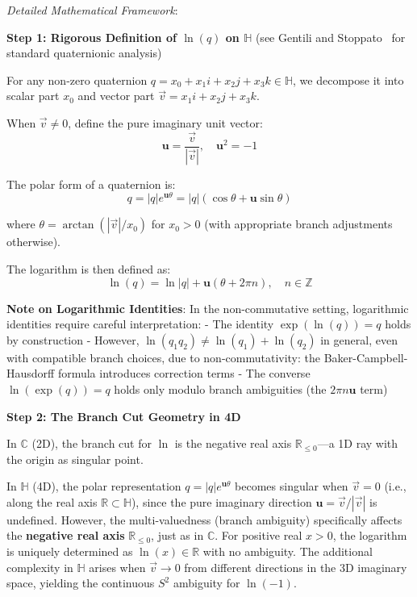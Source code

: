 \documentclass[11pt]{article}
\begin{document}
\emph{Detailed Mathematical Framework}:

\textbf{Step 1: Rigorous Definition of \(\ln(q)\) on $\mathbb{H}$} (see Gentili and Stoppato~\cite{GS13} for standard quaternionic analysis)

For any non-zero quaternion \(q = x_0 + x_1i + x_2j + x_3k \in \mathbb{H}\), we decompose it into scalar part \(x_0\) and vector part \(\vec{v} = x_1i + x_2j + x_3k\).

When \(\vec{v} \neq 0\), define the pure imaginary unit vector: \[\mathbf{u} = \frac{\vec{v}}{|\vec{v}|}, \quad \mathbf{u}^2 = -1\]

The polar form of a quaternion is: \[q = |q|e^{\mathbf{u}\theta} = |q|(\cos\theta + \mathbf{u}\sin\theta)\]

where \(\theta = \arctan(|\vec{v}|/x_0)\) for \(x_0 > 0\) (with appropriate branch adjustments otherwise).

The logarithm is then defined as: \[\ln(q) = \ln|q| + \mathbf{u}(\theta + 2\pi n), \quad n \in \mathbb{Z}\]

\textbf{Note on Logarithmic Identities}: In the non-commutative setting, logarithmic identities require careful interpretation: - The identity \(\exp(\ln(q)) = q\) holds by construction - However, \(\ln(q_1 q_2) \neq \ln(q_1) + \ln(q_2)\) in general, even with compatible branch choices, due to non-commutativity: the Baker-Campbell-Hausdorff formula introduces correction terms - The converse \(\ln(\exp(q)) = q\) holds only modulo branch ambiguities (the \(2\pi n \mathbf{u}\) term)

\textbf{Step 2: The Branch Cut Geometry in 4D}

In $\mathbb{C}$ (2D), the branch cut for \(\ln\) is the negative real axis \(\mathbb{R}_{\leq 0}\)---a 1D ray with the origin as singular point.

In $\mathbb{H}$ (4D), the polar representation $q = |q|e^{\mathbf{u}\theta}$ becomes singular when $\vec{v} = 0$ (i.e., along the real axis $\mathbb{R} \subset \mathbb{H}$), since the pure imaginary direction $\mathbf{u} = \vec{v}/|\vec{v}|$ is undefined. However, the multi-valuedness (branch ambiguity) specifically affects the \textbf{negative real axis} $\mathbb{R}_{\leq 0}$, just as in $\mathbb{C}$. For positive real $x > 0$, the logarithm is uniquely determined as $\ln(x) \in \mathbb{R}$ with no ambiguity. The additional complexity in $\mathbb{H}$ arises when $\vec{v} \to 0$ from different directions in the 3D imaginary space, yielding the continuous $S^2$ ambiguity for $\ln(-1)$.
\end{document}
